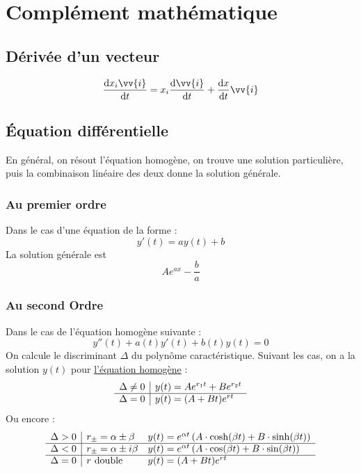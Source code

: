 \documentclass[11pt,a4paper,fleqn,pdftex]{report}
\begin{document}
\section{Complément mathématique}
\subsection{Dérivée d'un vecteur}
\vspace{0.7cm}
\begin{equation}
\dfrac{\d x_{i}\vv{i}}{\d t}=x_{i}\dfrac{\d \vv{i}}{\d t}+\dfrac{\d x}{\d t}\vv{i}
\end{equation}
\subsection{Équation différentielle} %
\label{sub:equa_diff}
En général, on résout l'équation homogène, on trouve une solution particulière, puis la combinaison linéaire des deux donne la solution générale.
\subsubsection{Au premier ordre} %
\label{ssub:equa_diff_premier}
Dans le cas d'une équation de la forme :
\[
  y'(t) = ay(t) + b
\]
La solution générale est 
\begin{equation}
A e^{ax} - \dfrac{b}{a}
\end{equation}
\subsubsection{Au second Ordre} %
\label{ssub:equa_diff_second}
Dans le cas de l'équation homogène suivante : \[
  y''(t) + a(t) y'(t) + b(t)y(t)= 0
\]
On calcule le discriminant $\Delta$ du polynôme caractéristique. Suivant les cas, on a la solution $y(t)$ pour \uline{l'équation homogène} : 
\[
\begin{array}{r | l}
\Delta \neq 0 & y(t) = A e^{r_1t}+B e^{r_2t}\\
\hline
\Delta = 0 & y(t) = (A+Bt)e^{rt}
\end{array}
\]
Ou encore : 
\[
\begin{array}{r | l l}
\Delta > 0 & r_{\pm}=\alpha \pm \beta &y(t) = e^{\alpha t}\left( A\cdot \cosh(\beta t) + B\cdot \sinh (\beta t) \right)
\\
\hline
\Delta < 0 & r_{\pm}=\alpha \pm i\beta &y(t) = e^{\alpha t}\left( A\cdot \cos (\beta t) + B\cdot \sin (\beta t) \right)
\\
\hline
\Delta = 0 & r \text{ double}& y(t) = (A+Bt)e^{rt}
\end{array}
\]
\end{document}
